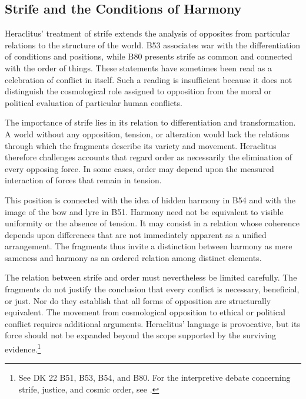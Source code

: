 
\subsection{Strife and the Conditions of Harmony}

\label{para:VS.B01.P01.C08.S03.SS06.P001}

Heraclitus' treatment of strife extends the analysis
of opposites from particular relations to the structure
of the world. B53 associates war with the differentiation
of conditions and positions, while B80 presents
strife as common and connected with the order of
things. These statements have sometimes been read
as a celebration of conflict in itself. Such a reading
is insufficient because it does not distinguish
the cosmological role assigned to opposition from
the moral or political evaluation of particular
human conflicts.

\label{para:VS.B01.P01.C08.S03.SS06.P002}

The importance of strife lies in its relation to
differentiation and transformation. A world without
any opposition, tension, or alteration would lack
the relations through which the fragments describe
its variety and movement. Heraclitus therefore
challenges accounts that regard order as necessarily
the elimination of every opposing force. In some
cases, order may depend upon the measured interaction
of forces that remain in tension.

\label{para:VS.B01.P01.C08.S03.SS06.P003}

This position is connected with the idea of hidden
harmony in B54 and with the image of the bow and
lyre in B51. Harmony need not be equivalent to
visible uniformity or the absence of tension. It
may consist in a relation whose coherence depends
upon differences that are not immediately apparent
as a unified arrangement. The fragments thus invite
a distinction between harmony as mere sameness
and harmony as an ordered relation among distinct
elements.

\label{para:VS.B01.P01.C08.S03.SS06.P004}

The relation between strife and order must nevertheless
be limited carefully. The fragments do not justify
the conclusion that every conflict is necessary,
beneficial, or just. Nor do they establish that
all forms of opposition are structurally equivalent.
The movement from cosmological opposition to
ethical or political conflict requires additional
arguments. Heraclitus' language is provocative,
but its force should not be expanded beyond the
scope supported by the surviving evidence.\footnote{See
DK 22 B51, B53, B54, and B80. For the interpretive
debate concerning strife, justice, and cosmic order,
see \cite{HeraclitusFragments,KirkHeraclitus1954,
GrahamHeraclitusSEP2023}.}

